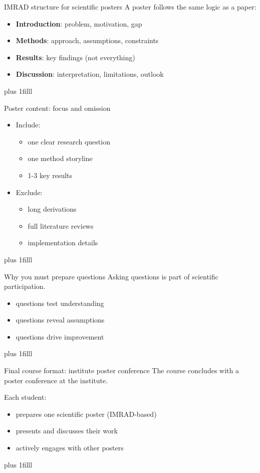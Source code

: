 \documentclass[aspectratio=169]{beamer}
\newcommand{\btVFill}{\vskip0pt plus 1filll}
\begin{document}
\begin{frame}{IMRAD structure for scientific posters}
  A poster follows the same logic as a paper:

  \bigskip
  \begin{itemize}
    \item \textbf{Introduction}: problem, motivation, gap
    \item \textbf{Methods}: approach, assumptions, constraints
    \item \textbf{Results}: key findings (not everything)
    \item \textbf{Discussion}: interpretation, limitations, outlook
  \end{itemize}
\btVFill
\end{frame}

\begin{frame}{Poster content: focus and omission}
  \begin{itemize}
    \item Include:
      \begin{itemize}
        \item one clear research question
        \item one method storyline
        \item 1-3 key results
      \end{itemize}
    \item Exclude:
      \begin{itemize}
        \item long derivations
        \item full literature reviews
        \item implementation details
      \end{itemize}
  \end{itemize}
\btVFill
\end{frame}

\begin{frame}{Why you must prepare questions}
  Asking questions is part of scientific participation.
  \begin{itemize}
    \item questions test understanding
    \item questions reveal assumptions
    \item questions drive improvement
  \end{itemize}

\btVFill
\end{frame}

\begin{frame}{Final course format: institute poster conference}
  The course concludes with a poster conference at the institute.

  \bigskip
  Each student:
  \begin{itemize}
    \item prepares one scientific poster (IMRAD-based)
    \item presents and discusses their work
    \item actively engages with other posters
  \end{itemize}
\btVFill
\end{frame}
\end{document}
